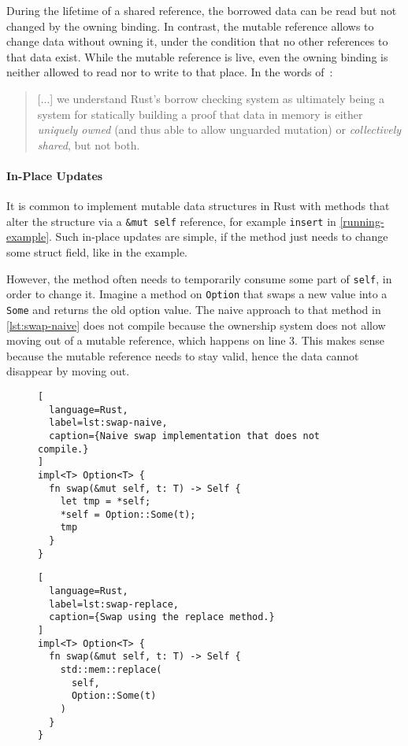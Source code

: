 During the lifetime of a shared reference, the borrowed data can be read but not
changed by the owning binding. In contrast, the mutable reference allows to
change data without owning it, under the condition that no other references to
that data exist. While the mutable reference is live, even the owning binding is
neither allowed to read nor to write to that place. In the words
of~\citet{oxide}:

\begin{quote}
{[...]} we understand Rust's borrow checking system as ultimately being a system
for statically building a proof that data in memory is either
\emph{uniquely owned} (and thus able to allow unguarded mutation) or
\emph{collectively shared}, but not both.
\end{quote}

\paragraph{In-Place Updates}

It is common to implement mutable data structures in Rust with methods that
alter the structure via a \passthrough{\lstinline!&mut self!} reference, for
example \lstinline!insert! in \autoref{running-example}. Such in-place updates
are simple, if the method just needs to change some struct field, like in the
example.

However, the method often needs to temporarily consume some part of
\lstinline!self!, in order to change it. Imagine a method on \lstinline!Option!
that swaps a new value into a \lstinline!Some! and returns the old option value.
The naive approach to that method in \autoref{lst:swap-naive} does not compile
because the ownership system does not allow moving out of a mutable reference,
which happens on line 3. This makes sense because the mutable reference needs
to stay valid, hence the data cannot disappear by moving out.

\begin{figure}[hbt]
\noindent\begin{minipage}[t]{.48\textwidth}
\begin{lstlisting}[
  language=Rust,
  label=lst:swap-naive,
  caption={Naive swap implementation that does not compile.}
]
impl<T> Option<T> {
  fn swap(&mut self, t: T) -> Self {
    let tmp = *self;
    *self = Option::Some(t);
    tmp
  }
}
\end{lstlisting}
\end{minipage}\hfill
\begin{minipage}[t]{.48\textwidth}
\begin{lstlisting}[
  language=Rust,
  label=lst:swap-replace,
  caption={Swap using the replace method.}
]
impl<T> Option<T> {
  fn swap(&mut self, t: T) -> Self {
    std::mem::replace(
      self,
      Option::Some(t)
    )
  }
}
\end{lstlisting}
\end{minipage}
\end{figure}


